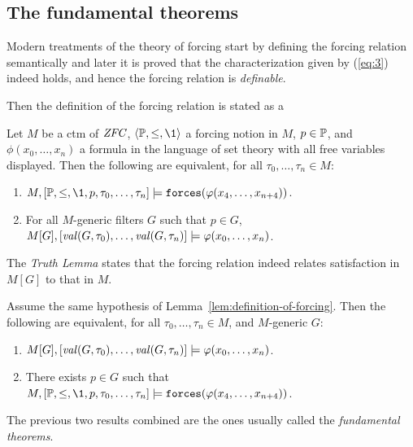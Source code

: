 \subsection{The fundamental theorems}
\label{sec:fundamental-theorems}
Modern treatments of the theory of forcing start
by defining the 
forcing relation semantically and later it is proved  that the
characterization given by (\ref{eq:3}) indeed holds, and hence the
forcing relation is \emph{definable}.

Then the definition of the forcing relation is stated as a
\begin{lemma}\label{lem:definition-of-forcing}
  Let $M$ be a ctm of $\mathit{ZFC}$, $\lb\PP,\leq,\1\rb$ a forcing notion
  in $M$, $p\in\mathbb{P}$, and $\phi(x_0,\dots,x_n)$ a formula in the
  language of set 
  theory with all free variables displayed. Then the
  following are equivalent, for all $\tau_0,\dots,\tau_n\in M$:
  \begin{enumerate}
  \item $M,[\PP,\leq,\1,p,\tau_0,\dots,\tau_n] 
  \models\forceisa(\phi(x_4,\dots,x_{n+4}))$.
  \item For all $M$-generic filters $G$ such that $p\in G$,
    $M[G],[\operatorname{\mathit{val}}(G,\tau_0),\dots,\operatorname{\mathit{val}}(G,\tau_n)] \models\varphi(x_0,\dots,x_n)$.
  \end{enumerate}
\end{lemma}

The \emph{Truth Lemma} states that the forcing
relation indeed relates 
satisfaction in $M[G]$ to that in $M$. 
\begin{lemma}\label{lem:truth-lemma}
  Assume the same hypothesis of
  Lemma~\ref{lem:definition-of-forcing}. Then the
  following are equivalent, for all $\tau_0,\dots,\tau_n\in M$, and
  $M$-generic $G$: 
  \begin{enumerate}
  \item $M[G],[\operatorname{\mathit{val}}(G,\tau_0),\dots,\operatorname{\mathit{val}}(G,\tau_n)]
  \models\varphi(x_0,\dots,x_n)$.
  \item  There exists $p\in G$ such that $M,[\PP,\leq,\1,p,\tau_0,\dots,\tau_n] 
  \models\forceisa(\phi(x_4,\dots,x_{n+4}))$.
  \end{enumerate}
\end{lemma}
The previous two results combined are the ones usually called the
\emph{fundamental theorems}. 

